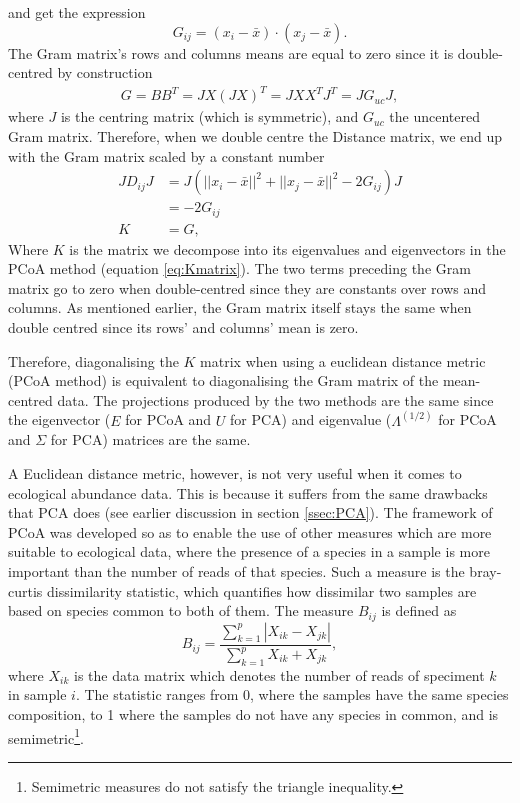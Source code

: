 and get the expression 
\begin{equation}
G_{ij} =(x_i-\bar{x}) \cdot (x_j-\bar{x}). 
\end{equation}
The Gram matrix's rows and columns means are equal to zero since it is double-centred by construction
\begin{align}
G = BB^T = JX(JX)^T = JXX^TJ^T = JG_{uc}J,
\end{align}
where $J$ is the centring matrix (which  is symmetric), and $G_{uc}$ the uncentered Gram matrix. Therefore, when we double centre the Distance matrix, we end up with the Gram matrix scaled by a constant number
\begin{align}
JD_{ij}J&= J\left(||x_i - \bar{x}||^2 + ||x_j - \bar{x}||^2 - 2G_{ij}\right)J \\
&= -2G_{ij}\\
K &= G,
\end{align}
Where $K$ is the matrix we decompose into its eigenvalues and eigenvectors in the PCoA method (equation \ref{eq:Kmatrix}). The two terms preceding the Gram matrix go to zero when double-centred since they are constants over rows and columns. As mentioned earlier, the Gram matrix itself stays the same when double centred since its rows' and columns' mean is zero. 

Therefore, diagonalising the $K$ matrix when using a euclidean distance metric (PCoA method) is equivalent to diagonalising the Gram matrix of the mean-centred data. The projections produced by the two methods are the same since the eigenvector ($E$ for PCoA and $U$ for PCA) and eigenvalue ($\Lambda^{(1/2)}$ for PCoA and $\Sigma $ for PCA) matrices are the same. 

A Euclidean distance metric, however, is not very useful when it comes to ecological abundance data. This is because it suffers from the same drawbacks that PCA does (see earlier discussion in section \ref{ssec:PCA}). The framework of PCoA was developed so as to enable the use of other measures which are more suitable to ecological data, where the presence of a species in a sample is more important than the number of reads of that species. Such a measure is the bray-curtis dissimilarity statistic, which quantifies how dissimilar two samples are based on species common to both of them. The measure $B_{ij}$ is defined as
\begin{equation}
    B_{ij} = \frac{\sum_{k =1}^{p} |X_{ik} - X_{jk}|}{\sum_{k =1}^{p} X_{ik} + X_{jk}},
\end{equation}
where $X_{ik}$ is the data matrix which denotes the number of reads of speciment $k$ in sample $i$. The statistic ranges from 0, where the samples have the same species composition, to 1 where the samples do not have any species in common, and is semimetric\footnote{Semimetric measures do not satisfy the triangle inequality.}.

